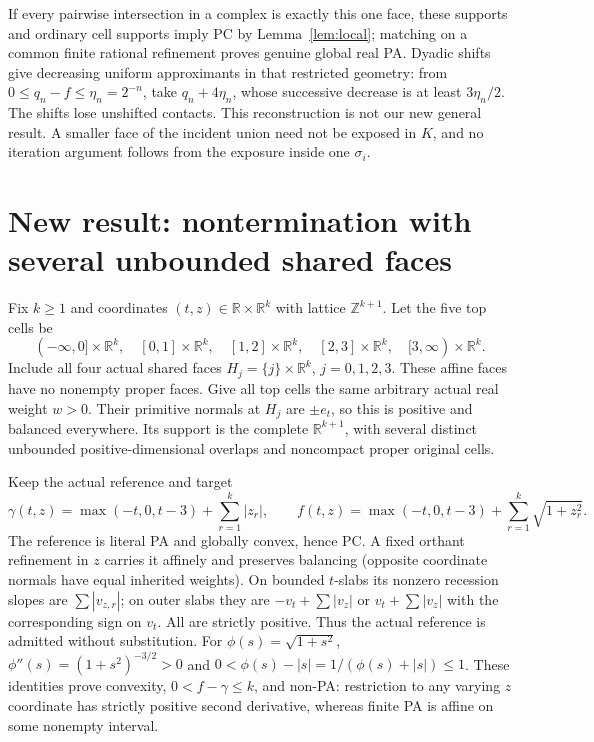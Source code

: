 \documentclass[11pt]{article}
\newcommand{\R}{\mathbb R}
\newcommand{\Z}{\mathbb Z}
\begin{document}
If every pairwise intersection in a complex is exactly this one face, these supports and ordinary cell supports imply PC by Lemma~\ref{lem:local}; matching on a common finite rational refinement proves genuine global real PA. Dyadic shifts give decreasing uniform approximants in that restricted geometry: from $0\leq q_n-f\leq\eta_n=2^{-n}$, take $q_n+4\eta_n$, whose successive decrease is at least $3\eta_n/2$. The shifts lose unshifted contacts. This reconstruction is not our new general result. A smaller face of the incident union need not be exposed in $K$, and no iteration argument follows from the exposure inside one $\sigma_i$.

\section{New result: nontermination with several unbounded shared faces}
Fix $k\geq1$ and coordinates $(t,z)\in\R\times\R^k$ with lattice $\Z^{k+1}$. Let the five top cells be
\[
 (-\infty,0]\times\R^k,\quad [0,1]\times\R^k,\quad [1,2]\times\R^k,
 \quad [2,3]\times\R^k,\quad [3,\infty)\times\R^k.
\]
Include all four actual shared faces $H_j=\{j\}\times\R^k$, $j=0,1,2,3$. These affine faces have no nonempty proper faces. Give all top cells the same arbitrary actual real weight $w>0$. Their primitive normals at $H_j$ are $\pm e_t$, so this is positive and balanced everywhere. Its support is the complete $\R^{k+1}$, with several distinct unbounded positive-dimensional overlaps and noncompact proper original cells.

Keep the actual reference and target
\[
 \gamma(t,z)=\max(-t,0,t-3)+\sum_{r=1}^k|z_r|,
 \qquad f(t,z)=\max(-t,0,t-3)+\sum_{r=1}^k\sqrt{1+z_r^2}.                 \tag{4.1}
\]
The reference is literal PA and globally convex, hence PC. A fixed orthant refinement in $z$ carries it affinely and preserves balancing (opposite coordinate normals have equal inherited weights). On bounded $t$-slabs its nonzero recession slopes are $\sum|v_{z,r}|$; on outer slabs they are $-v_t+\sum|v_z|$ or $v_t+\sum|v_z|$ with the corresponding sign on $v_t$. All are strictly positive. Thus the actual reference is admitted without substitution. For $\phi(s)=\sqrt{1+s^2}$, $\phi''(s)=(1+s^2)^{-3/2}>0$ and $0<\phi(s)-|s|=1/(\phi(s)+|s|)\leq1$. These identities prove convexity, $0<f-\gamma\leq k$, and non-PA: restriction to any varying $z$ coordinate has strictly positive second derivative, whereas finite PA is affine on some nonempty interval.
\end{document}
